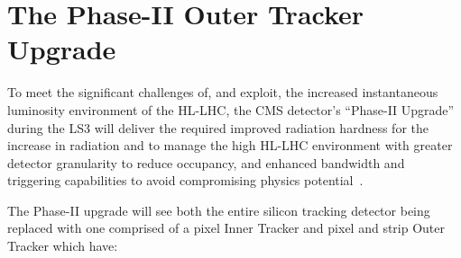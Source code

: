 \section{The Phase-II Outer Tracker Upgrade}\label{sec:tk-upgrade}
To meet the significant challenges of, and exploit, the increased instantaneous luminosity environment of the HL-LHC, the CMS detector's ``Phase-II Upgrade'' during the LS3 will deliver the required improved radiation hardness for the increase in radiation and to manage the high \PU HL-LHC environment with greater detector granularity to reduce occupancy, and enhanced bandwidth and triggering capabilities to avoid compromising physics potential~\cite{CMSCollaboration:2015zni,P2TrackerTDR}.

The Phase-II upgrade will see both the entire silicon tracking detector being replaced with one comprised of a pixel Inner Tracker and pixel and strip Outer Tracker which have:
